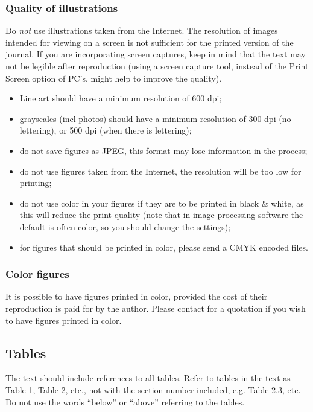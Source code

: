 \documentclass[ds]{iosart2x}
\begin{document}
\subsubsection{Quality of illustrations}\label{s3.8.2}
Do \textit{not} use illustrations taken from the Internet.
The resolution of images intended for viewing on a screen is not sufficient for the printed version of the journal.
If you are incorporating screen captures, keep in mind that the text may not be legible after reproduction
(using a screen capture tool, instead of the Print Screen option of PC's, might help to improve the quality).


\begin{itemize}
\item Line art should have a minimum resolution of 600 dpi;
\item  grayscales (incl photos) should have a minimum resolution of 300 dpi (no lettering), or 500 dpi (when there is lettering);
\item  do not save figures as JPEG, this format may lose information in the
process;
\item  do not use figures taken from the Internet, the resolution will be too low for
printing;
\item  do not use color in your figures if they are to be printed in black \& white, as this will reduce the print
quality (note that in image processing software the default is often color, so you should change the
settings);
\item  for figures that should be printed in color, please send a CMYK encoded files.
\end{itemize}

\subsubsection{Color figures}
It is possible to have figures printed in color,
provided the cost of their reproduction is paid for by the author.
Please contact  for a quotation if you wish to have figures printed in color.

\subsection{Tables}

The text should include references to all tables.
Refer to tables in the text as Table 1, Table 2, etc., not with the section number included,
 e.g. Table 2.3, etc. Do not use the words ``below'' or ``above'' referring to the
 tables.
\end{document}
